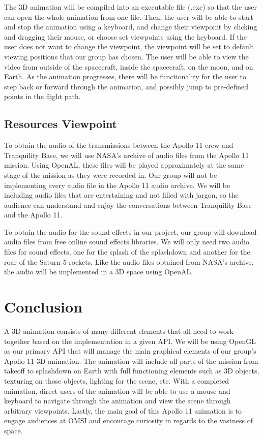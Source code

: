 \documentclass[onecolumn, draftclsnofoot,10pt, compsoc]{IEEEtran}
\begin{document}
       The 3D animation will be compiled into an executable file (.exe) so that the user can open the whole animation from one file. Then, the user will be able to start and stop the animation using a keyboard, and change their viewpoint by clicking and dragging their mouse, or choose set viewpoints using the keyboard. If the user does not want to change the viewpoint, the viewpoint will be set to default viewing positions that our group has chosen. The user will be able to view the video from outside of the spacecraft, inside the spacecraft, on the moon, and on Earth. As the animation progresses, there will be functionality for the user to step back or forward through the animation, and possibly jump to pre-defined points in the flight path.
    
    \subsection{Resources Viewpoint}
    To obtain the audio of the transmissions between the Apollo 11 crew and Tranquility Base, we will use NASA's archive of audio files from the Apollo 11 mission. Using OpenAL, these files will be played approximately at the same stage of the mission as they were recorded in. Our group will not be implementing every audio file in the Apollo 11 audio archive. We will be including audio files that are entertaining and not filled with jargon, so the audience can understand and enjoy the conversations between Tranquility Base and the Apollo 11.
    
    To obtain the audio for the sound effects in our project, our group will download audio files from free online sound effects libraries. We will only need two audio files for sound effects, one for the splash of the splashdown and another for the roar of the Saturn 5 rockets. Like the audio files obtained from NASA's archive, the audio will be implemented in a 3D space using OpenAL. 

\section{Conclusion}
A 3D animation consists of many different elements that all need to work together based on the implementation in a given API. We will be using OpenGL as our primary API that will manage the main graphical elements of our group's Apollo 11 3D animation. The animation will include all parts of the mission from takeoff to splashdown on Earth with full functioning elements such as 3D objects, texturing on those objects, lighting for the scene, etc. With a completed animation, direct users of the animation will be able to use a mouse and keyboard to navigate through the animation and view the scene through arbitrary viewpoints. Lastly, the main goal of this Apollo 11 animation is to engage audiences at OMSI and encourage curiosity in regards to the vastness of space. 
\end{document}
